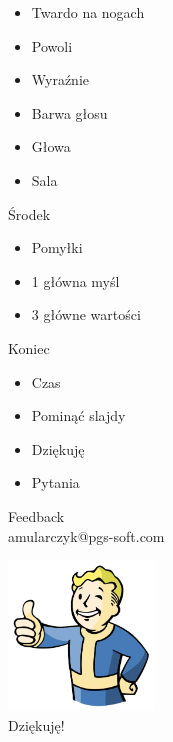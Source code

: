 \documentclass{beamer}
\begin{document}
\begin{frame}{}
	\begin{Large}
		\begin{itemize}
			\item Twardo na nogach
			\item Powoli
			\item Wyraźnie
			\item Barwa głosu
			\item Głowa
			\item Sala
		\end{itemize}
	\end{Large}
\end{frame}

\begin{frame}{}
	\begin{center}
		\Huge{Środek}
	\end{center}
\end{frame}

\begin{frame}{}
	\begin{Large}
		\begin{itemize}
			\item Pomyłki
			\item 1 główna myśl
			\item 3 główne wartości
		\end{itemize}
	\end{Large}
\end{frame}

\begin{frame}{}
	\begin{center}
		\Huge{Koniec}
	\end{center}
\end{frame}

\begin{frame}{}
	\begin{Large}
		\begin{itemize}
			\item Czas
			\item Pominąć slajdy
			\item Dziękuję
			\item Pytania
		\end{itemize}
	\end{Large}
\end{frame}

\begin{frame}{}
	\begin{center}
		\Huge{Feedback}\\
		\Large{amularczyk@pgs-soft.com}
	\end{center}
\end{frame}

\begin{frame}{}
	\begin{center}
  		\includegraphics[height=4cm]{ok.png} \\
		\Huge{Dziękuję!}
	\end{center}
\end{frame}
\end{document}
